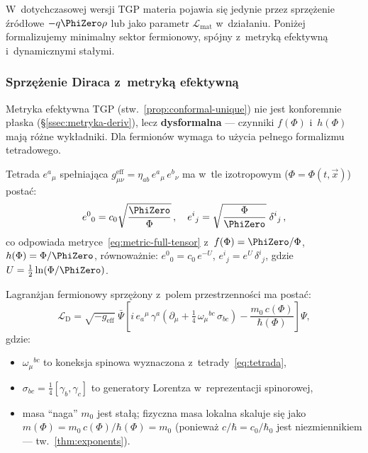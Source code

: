 W~dotychczasowej wersji TGP materia pojawia si\k{e} jedynie
przez sprz\k{e}\.zenie \'zr\'od\l{}owe $-q\PhiZero\rho$ lub
jako parametr $\mathcal{L}_{\mathrm{mat}}$ w~dzia\l{}aniu.
Poni\.zej formalizujemy minimalny sektor fermionowy, sp\'ojny
z~metryk\k{a} efektywn\k{a} i~dynamicznymi sta\l{}ymi.

\subsubsection{Sprz\k{e}\.zenie Diraca z~metryk\k{a} efektywn\k{a}}

Metryka efektywna TGP (stw.~\ref{prop:conformal-unique})
nie jest konforemnie p\l{}aska (\S\ref{ssec:metryka-deriv}),
lecz \textbf{dysformalna} --- czynniki $f(\Phi)$ i~$h(\Phi)$
maj\k{a} r\'o\.zne wyk\l{}adniki. Dla fermion\'ow wymaga to
u\.zycia pe\l{}nego formalizmu tetradowego.

\begin{definition}\label{def:tetrada}
Tetrada $e^a{}_\mu$ spe\l{}niaj\k{a}ca
$g_{\mu\nu}^{\mathrm{eff}} = \eta_{ab}\,e^a{}_\mu\,e^b{}_\nu$
ma w~tle izotropowym ($\Phi = \Phi(t,\vec{x})$) posta\'c:
\begin{equation}\label{eq:tetrada}
  e^0{}_0 = c_0\sqrt{\frac{\PhiZero}{\Phi}}\,, \quad
  e^i{}_j = \sqrt{\frac{\Phi}{\PhiZero}}\;\delta^i{}_j\,,
\end{equation}
co odpowiada metryce~\eqref{eq:metric-full-tensor}
z~$f(\Phi) = \PhiZero/\Phi$, $h(\Phi) = \Phi/\PhiZero$,
r\'ownowa\.znie: $e^0{}_0 = c_0\,e^{-U}$,
$e^i{}_j = e^{U}\,\delta^i{}_j$,
gdzie $U = \tfrac{1}{2}\ln(\Phi/\PhiZero)$.
\end{definition}

\begin{hypothesis}\label{hyp:dirac-TGP}
Lagran\.zjan fermionowy sprz\k{e}\.zony z~polem przestrzenno\'sci
ma posta\'c:
\begin{equation}\label{eq:dirac-TGP}
  \mathcal{L}_{\mathrm{D}}
  = \sqrt{-g_{\mathrm{eff}}}\;\bar{\Psi}\!\left[
    i\,e_a{}^\mu\,\gamma^a\!\left(
      \partial_\mu + \tfrac{1}{4}\,\omega_\mu{}^{bc}\,\sigma_{bc}
    \right)
    - \frac{m_0\,c(\Phi)}{\hbar(\Phi)}
  \right]\!\Psi,
\end{equation}
gdzie:
\begin{itemize}[nosep]
  \item $\omega_\mu{}^{bc}$ to koneksja spinowa wyznaczona
    z~tetrady~\eqref{eq:tetrada},
  \item $\sigma_{bc} = \tfrac{1}{4}[\gamma_b,\gamma_c]$ to generatory
    Lorentza w~reprezentacji spinorowej,
  \item masa ``naga'' $m_0$ jest sta\l{}\k{a}; fizyczna masa lokalna
    skaluje si\k{e} jako $m(\Phi) = m_0\,c(\Phi)/\hbar(\Phi) = m_0$
    (poniewa\.z $c/\hbar = c_0/\hbar_0$ jest niezmiennikiem ---
    tw.~\ref{thm:exponents}).
\end{itemize}
\end{hypothesis}

